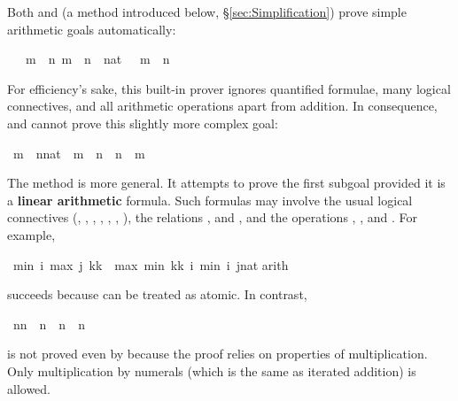 \begin{isabellebody}
\begin{isamarkuptext}
Both  and 
(a method introduced below, \S\ref{sec:Simplification}) prove 
simple arithmetic goals automatically:%
\end{isamarkuptext}%
\isamarkuptrue%
\ {\isachardoublequote}{\isasymlbrakk}\ {\isasymnot}\ m\ {\isacharless}\ n{\isacharsemicolon}\ m\ {\isacharless}\ n\ {\isacharplus}\ {\isacharparenleft}{}{\isacharcolon}{\isacharcolon}nat{\isacharparenright}\ {\isasymrbrakk}\ {\isasymLongrightarrow}\ m\ {\isacharequal}\ n{\isachardoublequote}\isamarkupfalse%
\isamarkupfalse%
%
\begin{isamarkuptext}%
\noindent
For efficiency's sake, this built-in prover ignores quantified formulae,
many logical connectives, and all arithmetic operations apart from addition.
In consequence,  and  cannot prove this slightly more complex goal:%
\end{isamarkuptext}%
\isamarkuptrue%
\ {\isachardoublequote}m\ {\isasymnoteq}\ {\isacharparenleft}n{\isacharcolon}{\isacharcolon}nat{\isacharparenright}\ {\isasymLongrightarrow}\ m\ {\isacharless}\ n\ {\isasymor}\ n\ {\isacharless}\ m{\isachardoublequote}\isamarkupfalse%
\isamarkupfalse%
%
\begin{isamarkuptext}%
\noindent The method  is more general.  It attempts to
prove the first subgoal provided it is a \textbf{linear arithmetic} formula.
Such formulas may involve the usual logical connectives (\isa{{\isasymnot}},
\isa{{\isasymand}}, \isa{{\isasymor}}, \isa{{\isasymlongrightarrow}}, \isa{{\isacharequal}},
\isa{{\isasymforall}}, \isa{{\isasymexists}}), the relations \isa{{\isacharequal}},
\isa{{\isasymle}} and \isa{{\isacharless}}, and the operations \isa{{\isacharplus}}, \isa{{\isacharminus}},
 and .  For example,%
\end{isamarkuptext}%
\isamarkuptrue%
\ {\isachardoublequote}min\ i\ {\isacharparenleft}max\ j\ {\isacharparenleft}k{\isacharasterisk}k{\isacharparenright}{\isacharparenright}\ {\isacharequal}\ max\ {\isacharparenleft}min\ {\isacharparenleft}k{\isacharasterisk}k{\isacharparenright}\ i{\isacharparenright}\ {\isacharparenleft}min\ i\ {\isacharparenleft}j{\isacharcolon}{\isacharcolon}nat{\isacharparenright}{\isacharparenright}{\isachardoublequote}\isanewline
\isamarkupfalse%
arith{\isacharparenright}\isamarkupfalse%
\isamarkupfalse%
%
\begin{isamarkuptext}%
\noindent
succeeds because  can be treated as atomic. In contrast,%
\end{isamarkuptext}%
\isamarkuptrue%
\ {\isachardoublequote}n{\isacharasterisk}n\ {\isacharequal}\ n\ {\isasymLongrightarrow}\ n{\isacharequal}{}\ {\isasymor}\ n{\isacharequal}{}{\isachardoublequote}\isamarkupfalse%
\isamarkupfalse%
%
\begin{isamarkuptext}%
\noindent
is not proved even by  because the proof relies 
on properties of multiplication. Only multiplication by numerals (which is
the same as iterated addition) is allowed.


\end{isamarkuptext}
\end{isabellebody}
